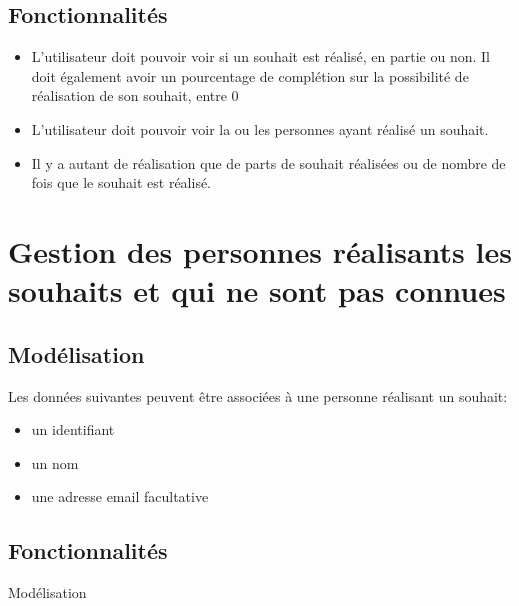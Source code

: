 \documentclass[11pt]{amsbook}
\newenvironment{sidebar}[1][r]
  {\wrapfigure{#1}{0.5\textwidth}\tcolorbox}
  {\endtcolorbox\endwrapfigure}
\begin{document}
\hypertarget{x-fonctionnalités}{\subsection{Fonctionnalités}}
\begin{itemize}

\item L’utilisateur doit pouvoir voir si un souhait est réalisé, en partie ou non. Il doit également avoir un pourcentage de complétion sur la possibilité de réalisation de son souhait, entre 0%

\item L’utilisateur doit pouvoir voir la ou les personnes ayant réalisé un souhait.

\item Il y a autant de réalisation que de parts de souhait réalisées ou de nombre de fois que le souhait est réalisé.

\end{itemize}


\hypertarget{x-gestion-des-personnes-réalisants-les-souhaits-et-qui-ne-sont-pas-connues}{\section{Gestion des personnes réalisants les souhaits et qui ne sont pas connues}}
\hypertarget{x-modélisation}{\subsection{Modélisation}}
Les données suivantes peuvent être associées à une personne réalisant un souhait:


\begin{itemize}

\item un identifiant

\item un nom

\item une adresse email facultative

\end{itemize}


\hypertarget{x-fonctionnalités}{\subsection{Fonctionnalités}}
\begin{sidebar}
Modélisation
\end{sidebar}
\end{document}
